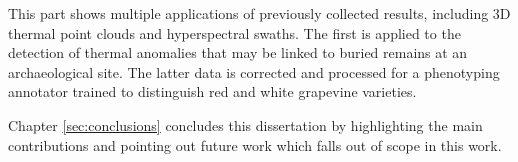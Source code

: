 \small {} \normalsize\hspace{3mm} This part shows multiple applications of previously collected results, including 3D thermal point clouds and hyperspectral swaths. The first is applied to the detection of thermal anomalies that may be linked to buried remains at an archaeological site. The latter data is corrected and processed for a phenotyping annotator trained to distinguish red and white grapevine varieties.

\small {} \normalsize\hspace{3mm} Chapter \ref{sec:conclusions} concludes this dissertation by highlighting the main contributions and pointing out future work which falls out of scope in this work.